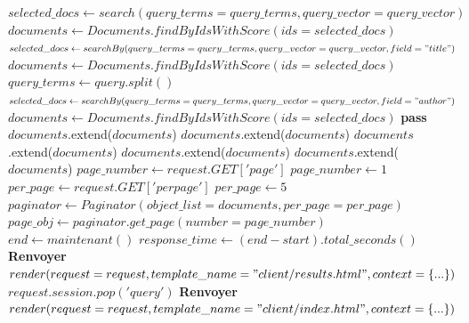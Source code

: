 \begin{algorithm}
\begin{algorithmic}[1]
                        \State $selected\_docs \gets search(query\_terms=query\_terms, query\_vector=query\_vector)$
                            \State $documents \gets Documents.findByIdsWithScore(ids = selected\_docs)$
                        \EndIf
                    \EndIf
                    \State
                        \State $selected\_docs \gets searchBy(query\_terms=query\_terms, query\_vector=query\_vector, field="title")$
                            \State $documents \gets Documents.findByIdsWithScore(ids = selected\_docs)$
                        \EndIf
                    \EndIf
                    \State
                        \State $query\_terms \gets query.split()$
                        \State $selected\_docs \gets searchBy(query\_terms=query\_terms, query\_vector=query\_vector, field="author")$
                            \State $documents \gets Documents.findByIdsWithScore(ids = selected\_docs)$
                        \EndIf
                    \EndIf
                \Else
                    \State \textbf{pass}
                \EndIf
                \State
                \State $documents$.extend($documents$)
                \State $documents$.extend($documents$)
                \State $documents$.extend($documents$)
                \State $documents$.extend($documents$)
                \State $documents$.extend($documents$)
                \State
                    \State $page\_number \gets request.GET['page']$
                \Else
                    \State $page\_number \gets 1$
                \EndIf
                \State
                    \State $per\_page \gets request.GET['perpage']$
                \Else
                    \State $per\_page \gets 5$
                \EndIf
                \State
                \State $paginator \gets Paginator(object\_list=documents, per\_page=per\_page)$
                \State $page\_obj \gets paginator.get\_page(number=page\_number)$
                \State
                \State $end \gets maintenant()$
                \State $response\_time \gets (end - start).total\_seconds()$
                \State
                \State \textbf{Renvoyer} $render(request=request, template\_name="client/results.html", context=\{... \})$
            \Else
                    \State $request.session.pop('query')$
                \EndIf
                \State
                \State \textbf{Renvoyer} $render(request=request, template\_name="client/index.html", context=\{... \})$
            \EndIf
        \EndProcedure
        \end{algorithmic}
    \end{algorithm}
        
